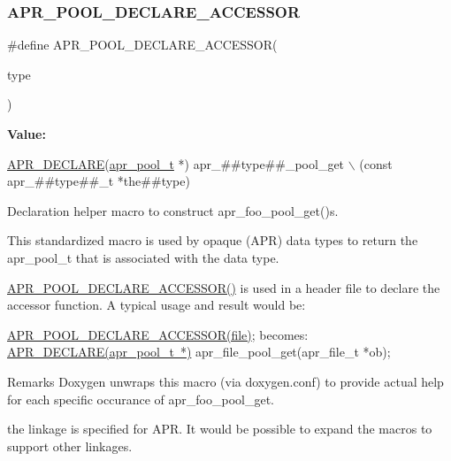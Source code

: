 \subsubsection{\texorpdfstring{A\+P\+R\+\_\+\+P\+O\+O\+L\+\_\+\+D\+E\+C\+L\+A\+R\+E\+\_\+\+A\+C\+C\+E\+S\+S\+OR}{APR\_POOL\_DECLARE\_ACCESSOR}}
{\footnotesize\ttfamily \#define A\+P\+R\+\_\+\+P\+O\+O\+L\+\_\+\+D\+E\+C\+L\+A\+R\+E\+\_\+\+A\+C\+C\+E\+S\+S\+OR(\begin{DoxyParamCaption}\item[{}]{type }\end{DoxyParamCaption})}

{\bfseries Value\+:}
\begin{DoxyCode}
\mbox{\hyperlink{group__apr__pools_ga95a4b4050d59535eea61951c649d49e6}{APR\_DECLARE}}(\mbox{\hyperlink{group__apr__pools_gaf137f28edcf9a086cd6bc36c20d7cdfb}{apr\_pool\_t}} *) apr\_##type##\_pool\_get \(\backslash\)
        (\textcolor{keyword}{const} apr\_##type##\_t *the##type)
\end{DoxyCode}
Declaration helper macro to construct apr\+\_\+foo\+\_\+pool\+\_\+get()s.

This standardized macro is used by opaque (A\+PR) data types to return the apr\+\_\+pool\+\_\+t that is associated with the data type.

\mbox{\hyperlink{group__apr__pools_ga89ce1d55c7f0c39ea87c88eabd655394}{A\+P\+R\+\_\+\+P\+O\+O\+L\+\_\+\+D\+E\+C\+L\+A\+R\+E\+\_\+\+A\+C\+C\+E\+S\+S\+O\+R()}} is used in a header file to declare the accessor function. A typical usage and result would be\+: 
\begin{DoxyPre}
   \mbox{\hyperlink{group__apr__pools_ga89ce1d55c7f0c39ea87c88eabd655394}{APR\_POOL\_DECLARE\_ACCESSOR(file)}};
becomes:
   \mbox{\hyperlink{group__apr__pools_ga514eba9e7f17bad2eb7a034c5b65352e}{APR\_DECLARE(apr\_pool\_t *)}} apr\_file\_pool\_get(apr\_file\_t *ob);
\end{DoxyPre}
 \begin{DoxyRemark}{Remarks}
Doxygen unwraps this macro (via doxygen.\+conf) to provide actual help for each specific occurance of apr\+\_\+foo\+\_\+pool\+\_\+get. 

the linkage is specified for A\+PR. It would be possible to expand the macros to support other linkages. 
\end{DoxyRemark}
\mbox{\label{group__apr__pools_ga43a8a52f68f8b7d3b7694c254da4a074}} 
